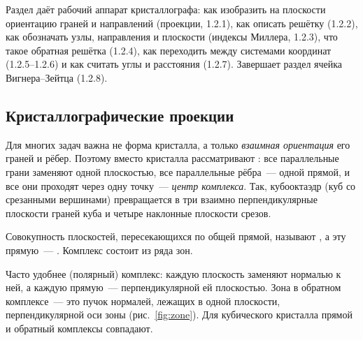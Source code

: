 \begin{orientir}
Раздел даёт рабочий аппарат кристаллографа: как изобразить на плоскости
ориентацию граней и направлений (проекции, 1.2.1), как описать решётку
(1.2.2), как обозначать узлы, направления и плоскости (индексы Миллера,
1.2.3), что такое обратная решётка (1.2.4), как переходить между
системами координат (1.2.5--1.2.6) и как считать углы и расстояния
(1.2.7). Завершает раздел ячейка Вигнера--Зейтца (1.2.8).
\end{orientir}

\subsection{Кристаллографические проекции}\label{ssec:projections}

Для многих задач важна не форма кристалла, а только \emph{взаимная
ориентация} его граней и рёбер. Поэтому вместо кристалла рассматривают
: все параллельные грани заменяют
одной плоскостью, все параллельные рёбра~— одной прямой, и все они
проходят через одну точку~— \emph{центр комплекса}. Так, кубооктаэдр (куб
со срезанными вершинами) превращается в три взаимно перпендикулярные
плоскости граней куба и четыре наклонные плоскости срезов.

\begin{opredelenie}[Зона]
Совокупность плоскостей, пересекающихся по общей прямой, называют
, а эту прямую~— .
Комплекс состоит из ряда зон.
\end{opredelenie}

Часто удобнее  (полярный) комплекс: каждую плоскость
заменяют нормалью к ней, а каждую прямую~— перпендикулярной ей плоскостью.
Зона в обратном комплексе~— это пучок нормалей, лежащих в одной
плоскости, перпендикулярной оси зоны (рис.~\ref{fig:zone}). Для
кубического кристалла прямой и обратный комплексы совпадают.

